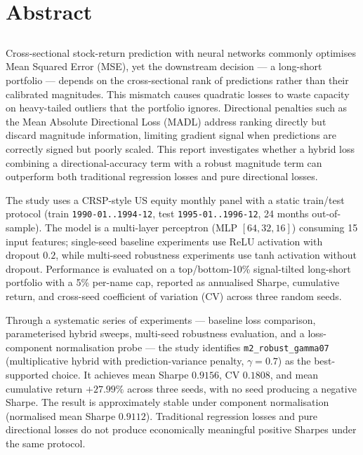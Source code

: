 \chapter*{Abstract}
\section*{}
Cross-sectional stock-return prediction with neural networks commonly optimises Mean Squared Error (MSE), yet the downstream decision --- a long-short portfolio --- depends on the cross-sectional rank of predictions rather than their calibrated magnitudes. This mismatch causes quadratic losses to waste capacity on heavy-tailed outliers that the portfolio ignores. Directional penalties such as the Mean Absolute Directional Loss (MADL) address ranking directly but discard magnitude information, limiting gradient signal when predictions are correctly signed but poorly scaled. This report investigates whether a hybrid loss combining a directional-accuracy term with a robust magnitude term can outperform both traditional regression losses and pure directional losses.

The study uses a CRSP-style US equity monthly panel with a static train/test protocol (train \texttt{1990-01..1994-12}, test \texttt{1995-01..1996-12}, 24 months out-of-sample). The model is a multi-layer perceptron (MLP $[64, 32, 16]$) consuming 15 input features; single-seed baseline experiments use ReLU activation with dropout $0.2$, while multi-seed robustness experiments use tanh activation without dropout. Performance is evaluated on a top/bottom-10\% signal-tilted long-short portfolio with a 5\% per-name cap, reported as annualised Sharpe, cumulative return, and cross-seed coefficient of variation (CV) across three random seeds.

Through a systematic series of experiments --- baseline loss comparison, parameterised hybrid sweeps, multi-seed robustness evaluation, and a loss-component normalisation probe --- the study identifies \texttt{m2\_robust\_gamma07} (multiplicative hybrid with prediction-variance penalty, $\gamma = 0.7$) as the best-supported choice. It achieves mean Sharpe $0.9156$, CV $0.1808$, and mean cumulative return $+27.99\%$ across three seeds, with no seed producing a negative Sharpe. The result is approximately stable under component normalisation (normalised mean Sharpe $0.9112$). Traditional regression losses and pure directional losses do not produce economically meaningful positive Sharpes under the same protocol.

